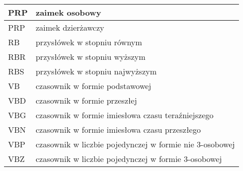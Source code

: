 \begin{table}[p]
\begin{tabular} {| l | l |}
        PRP              & zaimek osobowy                                          \\ \hline
        PRP              & zaimek dzierżawczy                                      \\ \hline
        RB               & przysłówek w stopniu równym                             \\ \hline
        RBR              & przysłówek w stopniu wyższym                            \\ \hline
        RBS              & przysłówek w stopniu najwyższym                         \\ \hline
        VB               & czasownik w formie podstawowej                          \\ \hline
        VBD              & czasownik w formie przeszłej                            \\ \hline
        VBG              & czasownik w formie imiesłowa czasu teraźniejszego       \\ \hline
        VBN              & czasownik w formie imiesłowa czasu przeszłego           \\ \hline
        VBP              & czasownik w liczbie pojedynczej w formie nie 3-osobowej \\ \hline
        VBZ              & czasownik w liczbie pojedynczej w formie 3-osobowej     \\ \hline
    \end{tabular}
\end{table}



